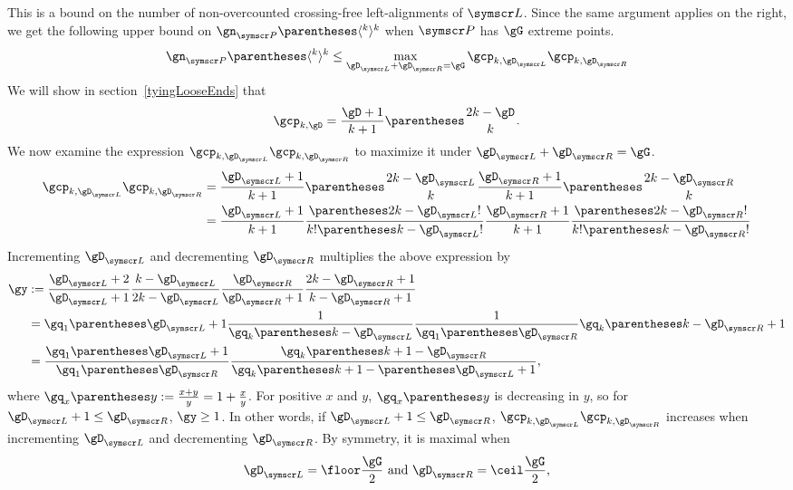 This is a bound on the number of non-overcounted crossing-free left-alignments of $\pointset L$.
Since the same argument applies on the right, we get the following upper bound on
$\gn_{\pointset P}\of{\langle^k\rangle^k}$ when $\pointset P$ has $\gG$ extreme points.\[
\gn_{\pointset P}\of{\langle^k\rangle^k}\leq
\max_{\gD_{\pointset L} + \gD_{\pointset R} = \gG} \gcp_{k,\gD_{\pointset L}} \gcp_{k,\gD_{\pointset R}}
\]
We will show in section~\ref{tyingLooseEnds} that\[
\gcp_{k,\gD}=\frac{\gD+1}{k+1}\binom{2k-\gD}{k}\text.
\]
We now examine the expression $\gcp_{k,\gD_{\pointset L}} \gcp_{k,\gD_{\pointset R}}$ to maximize it under
$\gD_{\pointset L} + \gD_{\pointset R} = \gG$.\begin{align*}
\gcp_{k,\gD_{\pointset L}} \gcp_{k,\gD_{\pointset R}} &=
\frac{\gD_{\pointset L}+1}{k+1}\binom{2k-\gD_{\pointset L}}{k} \frac{\gD_{\pointset R}+1}{k+1}\binom{2k-\gD_{\pointset R}}{k} \\
&= \frac{\gD_{\pointset L}+1}{k+1}
\frac{\Factorial{\pa{2k-\gD_{\pointset L}}}}{\Factorial k \Factorial{\pa{k-\gD_{\pointset L}}}}
\frac{\gD_{\pointset R}+1}{k+1}
\frac{\Factorial{\pa{2k-\gD_{\pointset R}}}}{\Factorial k \Factorial{\pa{k-\gD_{\pointset R}}}}
\end{align*}
Incrementing $\gD_{\pointset L}$ and decrementing $\gD_{\pointset R}$ multiplies the above expression by
\begin{align*}
\gy&\DefineAs
\frac{\gD_{\pointset L}+2}{\gD_{\pointset L}+1}
\frac{k-\gD_{\pointset L}}{2k-\gD_{\pointset L}}
\frac{\gD_{\pointset R}}{\gD_{\pointset R}+1}
\frac{2k-\gD_{\pointset R}+1}{k-\gD_{\pointset R}+1}\\
&=
\gq_1\of{\gD_{\pointset L}+1}
\frac{1}{\gq_k\of{k-\gD_{\pointset L}}}
\frac{1}{\gq_1\of{\gD_{\pointset R}}}
\gq_k\of{k-\gD_{\pointset R}+1} \\
&=
\frac{\gq_1\of{\gD_{\pointset L}+1}}{\gq_1\of{\gD_{\pointset R}}}
\frac{\gq_k\of{k+1-\gD_{\pointset R}}}{\gq_k\of{k+1-\pa{\gD_{\pointset L}+1}}}\text,
\end{align*}
where $\gq_x\of{y}\DefineAs\frac{x+y}{y}=1+\frac{x}{y}$.
For positive $x$ and $y$, $\gq_x\of{y}$ is decreasing in $y$, so for $\gD_{\pointset L}+1\leq \gD_{\pointset R}$,
$\gy\geq 1$. In other words, if $\gD_{\pointset L}+1\leq \gD_{\pointset R}$,
$\gcp_{k,\gD_{\pointset L}} \gcp_{k,\gD_{\pointset R}}$ increases when incrementing $\gD_{\pointset L}$ and
decrementing $\gD_{\pointset R}$. By symmetry, it is maximal when\[
\gD_{\pointset L} = \Floor{\frac \gG 2} \text{ and } \gD_{\pointset R} = \Ceiling{\frac \gG 2}\text,
\]
